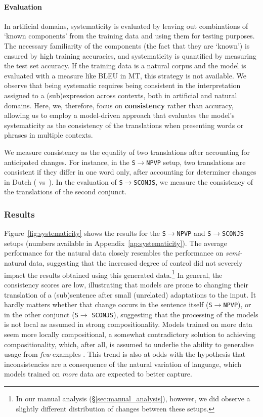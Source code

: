 \paragraph{Evaluation}
In artificial domains, systematicity is evaluated by leaving out combinations of `known components' from the training data and using them for testing purposes.
The necessary familiarity of the components (the fact that they are `known') is ensured by high training accuracies, and systematicity is quantified by measuring the test set accuracy.
If the training data is a natural corpus and the model is evaluated with a measure like BLEU in MT, this strategy is not available.
We observe that being systematic requires being consistent in the interpretation assigned to a (sub)expression across contexts, both in artificial and natural domains.
Here, we, therefore, focus on \textbf{consistency} rather than accuracy, allowing us to employ a model-driven approach that evaluates the model's systematicity as the consistency of the translations when presenting words or phrases in multiple contexts.

We measure consistency as the equality of two translations after accounting for anticipated changes.
For instance, in the \texttt{S\;$\rightarrow$\;NP\;VP} setup, two translations are consistent if they differ in one word only, after accounting for determiner changes in Dutch ( vs\ ).
In the evaluation of \texttt{S\;$\rightarrow$\;S\;CONJ\;S}, we measure the consistency of the translations of the second conjunct.

\subsubsection{Results}
Figure~\ref{fig:systematicity} shows the results for the \texttt{S\;$\rightarrow$\;NP\;VP} and \texttt{S\;$\rightarrow$\;S\;CONJ\;S} setups (numbers available in Appendix~\ref{ap:systematicity}).
The average performance for the natural data closely resembles the performance on \textit{semi-}natural data, suggesting that the increased degree of control did not severely impact the results obtained using this generated data.\footnote{In our manual analysis (\S\ref{sec:manual_analysis}), however, we did observe a slightly different distribution of changes between these setups.}
In general, the consistency scores are low, illustrating that models are prone to changing their translation of a (sub)sentence after small (unrelated) adaptations to the input.
It hardly matters whether that change occurs in the sentence itself (\texttt{S\;$\rightarrow$\;NP\;VP}), or in the other conjunct (\texttt{S\;$\rightarrow$} \texttt{S\;CONJ\;S}), suggesting that the processing of the models is not local as assumed in strong compositionality.
Models trained on more data seem more locally compositional, a somewhat contradictory solution to achieving compositionality, which, after all, is assumed to underlie the ability to generalise usage from \emph{few} examples \citep{lake2019human}.
This trend is also at odds with the hypothesis that inconsistencies are a consequence of the natural variation of language, which models trained on \emph{more} data are expected to better capture.
